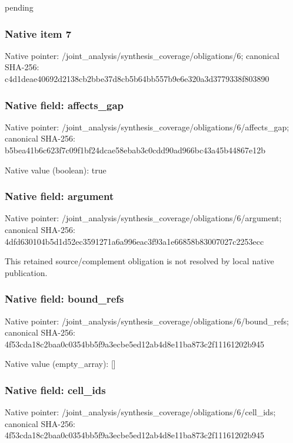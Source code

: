 \documentclass[10pt,a4paper]{article}
\begin{document}
\begingroup\raggedright\sloppy pending\par\endgroup

\subsubsection{Native item 7}
Native pointer: /joint\_\allowbreak{}analysis/synthesis\_\allowbreak{}coverage/obligations/6; canonical SHA-256: c4d1deae40692d2138cb2bbe37d8cb5b64bb557b9e6e320a3d3779338f803890

\subsubsection{Native field: affects\_\allowbreak{}gap}
Native pointer: /joint\_\allowbreak{}analysis/synthesis\_\allowbreak{}coverage/obligations/6/affects\_\allowbreak{}gap; canonical SHA-256: b5bea41b6c623f7c09f1bf24dcae58ebab3c0cdd90ad966bc43a45b44867e12b

Native value (boolean): true

\subsubsection{Native field: argument}
Native pointer: /joint\_\allowbreak{}analysis/synthesis\_\allowbreak{}coverage/obligations/6/argument; canonical SHA-256: 4dfd630104b5d1d52ec3591271a6a996eac3f93a1e66858b83007027c2253ecc

\begingroup\raggedright\sloppy This retained source/\allowbreak{}complement obligation is not resolved by local native publication.\par\endgroup

\subsubsection{Native field: bound\_\allowbreak{}refs}
Native pointer: /joint\_\allowbreak{}analysis/synthesis\_\allowbreak{}coverage/obligations/6/bound\_\allowbreak{}refs; canonical SHA-256: 4f53cda18c2baa0c0354bb5f9a3ecbe5ed12ab4d8e11ba873c2f11161202b945

Native value (empty\_\allowbreak{}array): []

\subsubsection{Native field: cell\_\allowbreak{}ids}
Native pointer: /joint\_\allowbreak{}analysis/synthesis\_\allowbreak{}coverage/obligations/6/cell\_\allowbreak{}ids; canonical SHA-256: 4f53cda18c2baa0c0354bb5f9a3ecbe5ed12ab4d8e11ba873c2f11161202b945
\end{document}
